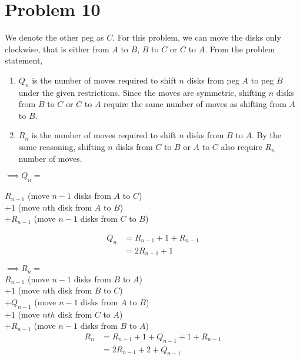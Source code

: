 \section*{Problem 10}
We denote the other peg as $C$. For this problem, we can move the disks only clockwise, that is either from $A$ to $B$, $B$ to $C$ or $C$ to $A$. From the problem statement,
\begin{enumerate}[label=(\roman*)]
    \item $Q_n$ is the number of moves required to shift $n$ disks from peg $A$ to peg $B$ under the given restrictions. Since the moves are symmetric, shifting $n$ disks from $B$ to $C$ or $C$ to $A$ require the same number of moves as shifting from $A$ to $B$.
    \item $R_n$ is the number of moves required to shift $n$ disks from $B$ to $A$. By the same reasoning, shifting $n$ disks from $C$ to $B$ or $A$ to $C$ also require $R_n$ number of moves.
\end{enumerate}

 $\implies Q_n =$

 $ R_{n-1}$ (move $n-1$ disks from $A$ to $C$)\\

 $ +1$ (move $n$th disk from $A$ to $B$)\\

 $ +R_{n-1}$ (move $n-1$ disks from $C$ to $B$)

\begin{align}
    Q_n & = R_{n-1} + 1 + R_{n-1} \nonumber \\
        & =2R_{n-1} + 1 \label{eq:10_1}
\end{align}

 $\implies R_n=$\\
 $R_{n-1}$ (move $n-1$ disks from $B$ to $A$)\\
 $+1$ (move $n$th disk from $B$ to $C$)\\
 $+Q_{n-1}$ (move $n-1$ disks from $A$ to $B$)\\
 $+1$ (move $nth$ disk from $C$ to $A$)\\
 $+R_{n-1}$ (move $n-1$ disks from $B$ to $A$)
\begin{align}
    R_n & = R_{n-1} + 1 + Q_{n-1} + 1 + R_{n-1} \nonumber \\
        & =2R_{n-1} + 2 + Q_{n-1} \label{eq:10_2}
\end{align}

